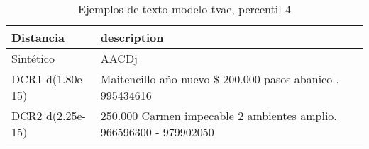 \begin{table}[H]
\centering
\fontsize{10}{14}\selectfont
\caption{Ejemplos de texto modelo tvae, percentil 4}
\label{table-example-economicos-b-2-tvae-4p-text}
\begin{tabular}{|l|m{35em}|}
\hline
\rowcolor[gray]{0.8}
Distancia & description \\
\hline Sintético & AACDj \\
\hline DCR1 d(1.80e-15) & Maitencillo a\~no nuevo \$ 200.000  pasos abanico . 995434616 \\
\hline DCR2 d(2.25e-15) & 250.000 Carmen impecable 2 ambientes amplio. 966596300 - 979902050 \\
\hline
\end{tabular}
\end{table}
